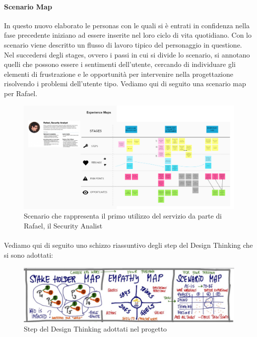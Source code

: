 \paragraph{Scenario Map}
In questo nuovo elaborato le personas con le quali si è entrati in confidenza nella fase precedente iniziano ad essere inserite nel loro ciclo di vita quotidiano. Con lo scenario viene descritto un flusso di lavoro tipico del personaggio in questione. Nel succedersi degli stages, ovvero i passi in cui si divide lo scenario, si annotano quelli che possono essere i sentimenti dell'utente, cercando di individuare gli elementi di frustrazione e le opportunità per intervenire nella progettazione risolvendo i problemi dell'utente tipo. Vediamo qui di seguito una scenario map per Rafael.
\begin{figure} [h!]
	\centering
	\includegraphics[width=0.7\linewidth]{capitoli/imgs/scenarioRafael.PNG}
	\caption{Scenario che rappresenta il primo utilizzo del servizio da parte di Rafael, il Security Analist }
	\label{fig:scen1}
\end{figure}

\paragraph{}
Vediamo qui di seguito uno schizzo riassuntivo degli step del Design Thinking che si sono adottati:
\begin{figure} [h!]
	\centering
	\includegraphics[width=0.7\linewidth]{capitoli/imgs/schizzodesthink.PNG}
	\caption{Step del Design Thinking adottati nel progetto}
	\label{fig:dt}
\end{figure}

